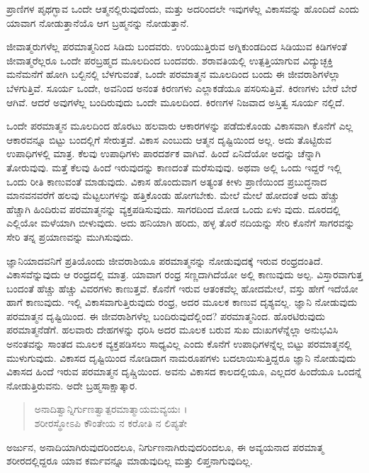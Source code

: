 {\small ಪ್ರಾಣಿಗಳ ಪೃಥಗ್ಭಾವ ಒಂದೇ ಆತ್ಮನಲ್ಲಿರುವುದೆಂದು, ಮತ್ತು ಅದರಿಂದಲೇ ಇವುಗಳೆಲ್ಲ ವಿಕಾಸವನ್ನು ಹೊಂದಿದೆ ಎಂದು ಯಾವಾಗ ನೋಡುತ್ತಾನೆಯೊ ಆಗ ಬ್ರಹ್ಮನನ್ನು ನೋಡುತ್ತಾನೆ.}

ಜೀವಾತ್ಮರುಗಳೆಲ್ಲ ಪರಮಾತ್ಮನಿಂದ ಸಿಡಿದು ಬಂದವರು. ಉರಿಯುತ್ತಿರುವ ಅಗ್ನಿಕುಂಡದಿಂದ ಸಿಡಿಯುವ ಕಿಡಿಗಳಂತೆ ಜೀವಾತ್ಮರೆಲ್ಲರೂ ಒಂದೇ ಪರಬ್ರಹ್ಮದ ಮೂಲದಿಂದ ಬಂದವರು. ಶರಾವತಿಯಲ್ಲಿ ಉತ್ಪತ್ತಿಯಾಗುವ ವಿದ್ಯುಚ್ಛಕ್ತಿ ಮನೆಮನೆಗೆ ಹೋಗಿ ಬಲ್ಬಿನಲ್ಲಿ ಬೆಳಗುವಂತೆ, ಒಂದೇ ಪರಮಾತ್ಮನ ಮೂಲದಿಂದ ಬಂದು ಈ ಜೀವರಾಶಿಗಳೆಲ್ಲಾ ಬೆಳಗುತ್ತಿವೆ. ಸೂರ್ಯ ಒಂದೇ, ಅವನಿಂದ ಅನಂತ ಕಿರಣಗಳು ಎಲ್ಲಾಕಡೆಯೂ ಪಸರಿಸುತ್ತಿವೆ. ಕಿರಣಗಳು ಬೇರೆ ಬೇರೆ ಆಗಿವೆ. ಆದರೆ ಅವುಗಳೆಲ್ಲ ಬಂದಿರುವುದು ಒಂದೇ ಮೂಲದಿಂದ. ಕಿರಣಗಳ ನಿಜವಾದ ಅಸ್ತಿತ್ವ ಸೂರ್ಯ ನಲ್ಲಿದೆ.

ಒಂದೇ ಪರಮಾತ್ಮನ ಮೂಲದಿಂದ ಹೊರಟು ಹಲವಾರು ಆಕಾರಗಳನ್ನು ಪಡೆದುಕೊಂಡು ವಿಕಾಸವಾಗಿ ಕೊನೆಗೆ ಎಲ್ಲ ಆಕಾರವನ್ನೂ ಬಿಟ್ಟು ಬಂದಲ್ಲಿಗೆ ಸೇರುತ್ತವೆ. ವಿಕಾಸ ಎಂಬುದು ಆತ್ಮನ ದೃಷ್ಟಿಯಿಂದ ಅಲ್ಲ. ಅದು ತೊಟ್ಟಿರುವ ಉಪಾಧಿಗಳಲ್ಲಿ ಮಾತ್ರ. ಕೆಲವು ಉಪಾಧಿಗಳು ಪಾರದರ್ಶಕ ವಾಗಿವೆ. ಹಿಂದೆ ಏನಿದೆಯೋ ಅದನ್ನು ಚೆನ್ನಾಗಿ ತೋರುವುವು. ಮತ್ತೆ ಕೆಲವು ಹಿಂದೆ ಇರುವುದನ್ನು ಕಾಣದಂತೆ ಮರೆಸುವುವು. ಅಥವಾ ಅಲ್ಲಿ ಒಂದು ಇದ್ದರೆ ಇಲ್ಲಿ ಒಂದು ರೀತಿ ಕಾಣುವಂತೆ ಮಾಡುವುದು. ವಿಕಾಸ ಹೊಂದುವಾಗ ಅತ್ಯಂತ ಕೀಳು ಪ್ರಾಣಿಯಿಂದ ಪ್ರಬುದ್ಧನಾದ ಮಾನವನವರೆಗೆ ಹಲವು ಮೆಟ್ಟಲುಗಳನ್ನು ಹತ್ತಿಕೊಂಡು ಹೋಗಬೇಕು. ಮೇಲೆ ಮೇಲೆ ಹೋದಂತೆ ಅದು ಹೆಚ್ಚು ಹೆಚ್ಚಾಗಿ ಹಿಂದಿರುವ ಪರಮಾತ್ಮನನ್ನು ವ್ಯಕ್ತಪಡಿಸುವುದು. ಸಾಗರದಿಂದ ಮೋಡ ಒಂದು ಏಳು ವುದು. ದೂರದಲ್ಲಿ ಎಲ್ಲಿಯೋ ಮಳೆಯಾಗಿ ಬೀಳುವುದು. ಅದು ಹನಿಯಾಗಿ ಹರಿದು, ಹಳ್ಳ ತೊರೆ ನದಿಯನ್ನು ಸೇರಿ ಕೊನೆಗೆ ಸಾಗರವನ್ನು ಸೇರಿ ತನ್ನ ಪ್ರಯಾಣವನ್ನು ಮುಗಿಸುವುದು.

ಜ್ಞಾನಿಯಾದವನಿಗೆ ಪ್ರತಿಯೊಂದು ಜೀವರಾಶಿಯೂ ಪರಮಾತ್ಮನನ್ನು ನೋಡುವುದಕ್ಕೆ ಇರುವ ರಂಧ್ರದಂತಿದೆ. ವಿಕಾಸವೆನ್ನುವುದು ಆ ರಂಧ್ರದಲ್ಲಿ ಮಾತ್ರ. ಯಾವಾಗ ರಂಧ್ರ ಸಣ್ಣದಾಗಿದೆಯೋ ಅಲ್ಲಿ ಕಾಣುವುದು ಅಲ್ಪ. ವಿಸ್ತಾರವಾಗುತ್ತ ಬಂದಂತೆ ಹೆಚ್ಚು ಹೆಚ್ಚು ವಿವರಗಳು ಕಾಣುತ್ತವೆ. ಕೊನೆಗೆ ಇರುವ ಆತಂಕವೆಲ್ಲ ಹೋದಮೇಲೆ, ವಸ್ತು ಹೇಗೆ ಇದೆಯೋ ಹಾಗೆ ಕಾಣುವುದು. ಇಲ್ಲಿ ವಿಕಾಸವಾಗುತ್ತಿರುವುದು ರಂಧ್ರ, ಅದರ ಮೂಲಕ ಕಾಣುವ ದೃಶ್ಯವಲ್ಲ. ಜ್ಞಾನಿ ನೋಡುವುದು ಪರಮಾತ್ಮನ ದೃಷ್ಟಿಯಿಂದ. ಈ ಜೀವರಾಶಿಗಳೆಲ್ಲ ಬಂದಿರುವುದೆಲ್ಲಿಂದ? ಪರಮಾತ್ಮನಿಂದ. ಹೊರಟಿರುವುದು ಪರಮಾತ್ಮನೆಡೆಗೆ. ಹಲವಾರು ದೇಹಗಳನ್ನು ಧರಿಸಿ ಅದರ ಮೂಲಕ ಬರುವ ಸುಖ ದುಃಖಗಳೆನ್ನೆಲ್ಲಾ ಅನುಭವಿಸಿ ಅನಂತವನ್ನು ಸಾಂತದ ಮೂಲಕ ವ್ಯಕ್ತಪಡಿಸಲು ಸಾಧ್ಯವಿಲ್ಲ ಎಂದು ಕೊನೆಗೆ ಉಪಾಧಿಗಳನ್ನೆಲ್ಲ ಬಿಟ್ಟು ಪರಮಾತ್ಮನಲ್ಲಿ ಮುಳುಗುವುದು. ವಿಕಾಸದ ದೃಷ್ಟಿಯಿಂದ ನೋಡಿದಾಗ ನಾಮರೂಪಗಳು ಬದಲಾಯಿಸುತ್ತಿದ್ದರೂ ಜ್ಞಾನಿ ನೋಡುವುದು ವಿಕಾಸದ ಹಿಂದೆ ಇರುವ ಪರಮಾತ್ಮನ ದೃಷ್ಚಿಯಿಂದ. ಅವನು ವಿಕಾಸದ ಕಾಲದಲ್ಲಿಯೂ, ಎಲ್ಲದರ ಹಿಂದೆಯೂ ಒಂದನ್ನೆ ನೋಡುತ್ತಿರುವನು. ಅದೇ ಬ್ರಹ್ಮಸಾಕ್ಷಾತ್ಕಾರ.

\begin{verse}
ಅನಾದಿತ್ವಾನ್ನಿರ್ಗುಣತ್ವಾತ್ಪರಮಾತ್ಮಾಯಮವ್ಯಯಃ ।\\ಶರೀರಸ್ಥೋಽಪಿ ಕೌಂತೇಯ ನ ಕರೋತಿ ನ ಲಿಪ್ಯತೇ 
\end{verse}

{\small ಅರ್ಜುನ, ಅನಾದಿಯಾಗಿರುವುದರಿಂದಲೂ, ನಿರ್ಗುಣನಾಗಿರುವುದರಿಂದಲೂ, ಈ ಅವ್ಯಯನಾದ ಪರಮಾತ್ಮ ಶರೀರದಲ್ಲಿದ್ದರೂ ಯಾವ ಕರ್ಮವನ್ನೂ ಮಾಡುವುದಿಲ್ಲ ಮತ್ತು ಲಿಪ್ತನಾಗುವುದಿಲ್ಲ.}

